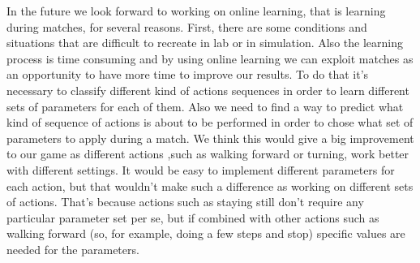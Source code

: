 \documentclass{article}
\begin{document}
In the future we look forward to working on online learning, that is learning during matches, for several reasons. First, there are some conditions and situations that are difficult to recreate in lab or in simulation. Also the learning process is time consuming and by using online learning we can exploit matches as an opportunity to have more time to improve our results. To do that it's necessary to classify different kind of actions sequences in order to learn different sets of parameters for each of them. Also we need to find a way to predict what kind of sequence of actions is about to be performed in order to chose what set of parameters to apply during a match. We think this would give a big improvement to our game as different actions ,such as walking forward or turning, work better with different settings. It would be easy to implement different parameters for each action, but that wouldn't make such a difference as working on different sets of actions. That's because actions such as staying still don't require any particular parameter set per se, but if combined with other actions such as walking forward (so, for example, doing a few steps and stop) specific values are needed for the parameters. 




\end{document}
